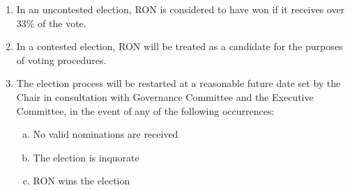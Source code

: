\documentclass[12pt]{article}
\begin{document}
\begin{enumerate}
    \item In an uncontested election, RON is considered to have won if it receives over 33\% of the vote.
    \item In a contested election, RON will be treated as a candidate for the purposes of voting procedures.
    \item The election process will be restarted at a reasonable future date set by the Chair in consultation with Governance Committee and the Executive Committee, in the event of any of the following occurrences:
    \begin{enumerate}[(a)]
        \item No valid nominations are received
        \item The election is inquorate
        \item RON wins the election
    \end{enumerate}

\end{enumerate}
\end{document}
